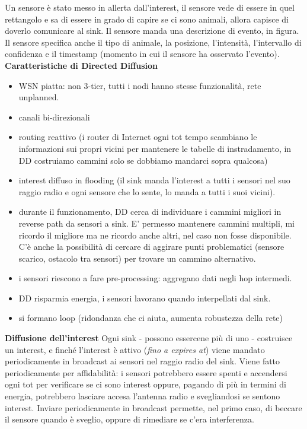 \documentclass[12pt,italian]{report}
\begin{document}
Un sensore è stato messo in allerta dall'interest, il sensore vede di essere in quel rettangolo e sa di essere in grado di capire se ci sono animali, allora capisce di doverlo comunicare al sink. Il sensore manda una descrizione di evento, in figura. Il sensore specifica anche il tipo di animale, la posizione, l'intensità, l'intervallo di confidenza e il timestamp (momento in cui il sensore ha osservato l'evento). 
\bigbreak
\noindent \textbf{Caratteristiche di Directed Diffusion}
\begin{itemize}
    \item WSN piatta: non 3-tier, tutti i nodi hanno stesse funzionalità, rete unplanned.
    \item canali bi-direzionali 
    \item routing reattivo (i router di Internet ogni tot tempo scambiano le informazioni sui propri vicini per mantenere le tabelle di instradamento, in DD costruiamo cammini solo se dobbiamo mandarci sopra qualcosa) 
    \item interest diffuso in flooding (il sink manda l'interest a tutti i sensori nel suo raggio radio e ogni sensore che lo sente, lo manda a tutti i suoi vicini). 
    \item durante il funzionamento, DD cerca di individuare i cammini migliori in reverse path da sensori a sink. E' permesso mantenere cammini multipli, mi ricordo il migliore ma ne ricordo anche altri, nel caso non fosse disponibile. C'è anche la possibilità di cercare di aggirare punti problematici (sensore scarico, ostacolo tra sensori) per trovare un cammino alternativo. 
    \item i sensori riescono a fare pre-processing: aggregano dati negli hop intermedi. 
    \item DD risparmia energia, i sensori lavorano quando interpellati dal sink.
    \item si formano loop (ridondanza che ci aiuta, aumenta robustezza della rete)
\end{itemize}
\bigbreak
\noindent \textbf{Diffusione dell'interest} 
\bigbreak
\noindent Ogni sink - possono essercene più di uno - costruisce un interest, e finché l'interest è attivo (\textit{fino a expires at}) viene mandato periodicamente in broadcast ai sensori nel raggio radio del sink. Viene fatto periodicamente per affidabilità: i sensori potrebbero essere spenti e accendersi ogni tot per verificare se ci sono interest oppure, pagando di più in termini di energia, potrebbero lasciare accesa l'antenna radio e svegliandosi se sentono interest. Inviare periodicamente in broadcast permette, nel primo caso, di beccare il sensore quando è sveglio, oppure di rimediare se c'era interferenza. 
\end{document}
